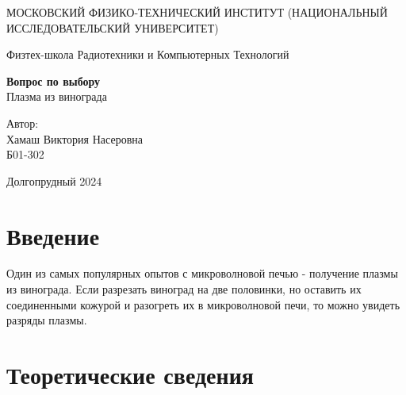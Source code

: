 \documentclass[a4paper,12pt]{article}
\begin{document}
	
	\begin{titlepage}
		\begin{center}
			{\large МОСКОВСКИЙ ФИЗИКО-ТЕХНИЧЕСКИЙ ИНСТИТУТ (НАЦИОНАЛЬНЫЙ ИССЛЕДОВАТЕЛЬСКИЙ УНИВЕРСИТЕТ)}
		\end{center}
		\begin{center}
			{\large Физтех-школа Радиотехники и Компьютерных Технологий}
		\end{center}
		
		
		\vspace{4.5cm}
		{\huge
			\begin{center}
				{\bf Вопрос по выбору}\\
				Плазма из винограда
			\end{center}
		}
		\vspace{2cm}
		\begin{flushright}
			{\LARGE Автор:\\Хамаш Виктория Насеровна \\
				\vspace{0.2cm}
				Б01-302}
		\end{flushright}
		\vspace{7.5cm}
		\begin{center}
			Долгопрудный 2024
		\end{center}
	\end{titlepage}

	\section{Введение}
	Один из самых популярных опытов с микроволновой печью - получение плазмы из винограда. Если разрезать виноград на две половинки, но оставить их соединенными кожурой и разогреть их в микроволновой печи, то можно увидеть разряды плазмы.
	\section{Теоретические сведения}
	
\end{document}
